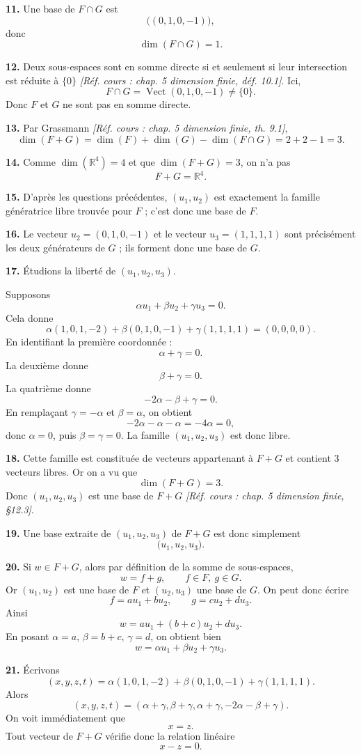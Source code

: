 \documentclass[11pt,a4paper]{article}
\newcommand{\R}{\mathbb{R}}
\newcommand{\Vect}{\operatorname{Vect}}
\newcommand{\dimv}{\operatorname{dim}}
\newcommand{\cours}[1]{\textit{[Réf. cours : #1]}}
\newcommand{\p}[1]{\medskip\noindent\textbf{#1.}}
\begin{document}
\p{11} Une base de $F\cap G$ est
\[
\bigl((0,1,0,-1)\bigr),
\]
donc
\[
\dimv(F\cap G)=1.
\]

\p{12} Deux sous-espaces sont en somme directe si et seulement si leur intersection est réduite à $\{0\}$ \cours{chap. 5 dimension finie, déf. 10.1}. Ici,
\[
F\cap G=\Vect(0,1,0,-1)\neq\{0\}.
\]
Donc $F$ et $G$ ne sont pas en somme directe.

\p{13} Par Grassmann \cours{chap. 5 dimension finie, th. 9.1},
\[
\dimv(F+G)=\dimv(F)+\dimv(G)-\dimv(F\cap G)=2+2-1=3.
\]

\p{14} Comme $\dimv(\R^4)=4$ et que $\dimv(F+G)=3$, on n'a pas
\[
F+G=\R^4.
\]

\p{15} D'après les questions précédentes, $(u_1,u_2)$ est exactement la famille génératrice libre trouvée pour $F$ ; c'est donc une base de $F$.

\p{16} Le vecteur $u_2=(0,1,0,-1)$ et le vecteur $u_3=(1,1,1,1)$ sont précisément les deux générateurs de $G$ ; ils forment donc une base de $G$.

\p{17} Étudions la liberté de $(u_1,u_2,u_3)$.

Supposons
\[
\alpha u_1+\beta u_2+\gamma u_3=0.
\]
Cela donne
\[
\alpha(1,0,1,-2)+\beta(0,1,0,-1)+\gamma(1,1,1,1)=(0,0,0,0).
\]
En identifiant la première coordonnée :
\[
\alpha+\gamma=0.
\]
La deuxième donne
\[
\beta+\gamma=0.
\]
La quatrième donne
\[
-2\alpha-\beta+\gamma=0.
\]
En remplaçant $\gamma=-\alpha$ et $\beta=\alpha$, on obtient
\[
-2\alpha-\alpha-\alpha=-4\alpha=0,
\]
donc $\alpha=0$, puis $\beta=\gamma=0$.
La famille $(u_1,u_2,u_3)$ est donc libre.

\p{18} Cette famille est constituée de vecteurs appartenant à $F+G$ et contient $3$ vecteurs libres. Or on a vu que
\[
\dimv(F+G)=3.
\]
Donc $(u_1,u_2,u_3)$ est une base de $F+G$ \cours{chap. 5 dimension finie, §12.3}.

\p{19} Une base extraite de $(u_1,u_2,u_3)$ de $F+G$ est donc simplement
\[
\bigl(u_1,u_2,u_3\bigr).
\]

\p{20} Si $w\in F+G$, alors par définition de la somme de sous-espaces,
\[
w=f+g,
\qquad f\in F,\ g\in G.
\]
Or $(u_1,u_2)$ est une base de $F$ et $(u_2,u_3)$ une base de $G$. On peut donc écrire
\[
f=au_1+bu_2,
\qquad g=cu_2+du_3.
\]
Ainsi
\[
w=au_1+(b+c)u_2+du_3.
\]
En posant $\alpha=a$, $\beta=b+c$, $\gamma=d$, on obtient bien
\[
w=\alpha u_1+\beta u_2+\gamma u_3.
\]

\p{21} Écrivons
\[
(x,y,z,t)=\alpha(1,0,1,-2)+\beta(0,1,0,-1)+\gamma(1,1,1,1).
\]
Alors
\[
(x,y,z,t)=(\alpha+\gamma,\beta+\gamma,\alpha+\gamma,-2\alpha-\beta+\gamma).
\]
On voit immédiatement que
\[
x=z.
\]
Tout vecteur de $F+G$ vérifie donc la relation linéaire
\[
x-z=0.
\]
\end{document}
